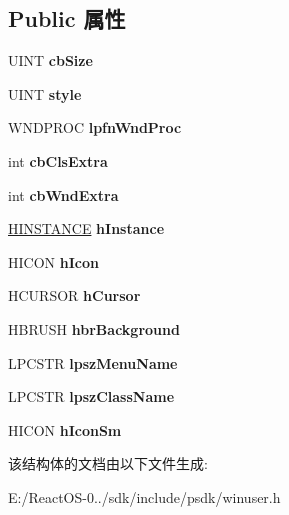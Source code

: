 \subsection*{Public 属性}
\begin{DoxyCompactItemize}
\item 
\mbox{\label{struct___w_n_d_c_l_a_s_s_e_x_a_aa01d015d223ea74c619ea89ccd707ed6}} 
U\+I\+NT {\bfseries cb\+Size}
\item 
\mbox{\label{struct___w_n_d_c_l_a_s_s_e_x_a_a96fccbeabe8f9ae63be08db3af3f5079}} 
U\+I\+NT {\bfseries style}
\item 
\mbox{\label{struct___w_n_d_c_l_a_s_s_e_x_a_ab196a241b43101d6a1db0991bd351076}} 
W\+N\+D\+P\+R\+OC {\bfseries lpfn\+Wnd\+Proc}
\item 
\mbox{\label{struct___w_n_d_c_l_a_s_s_e_x_a_a026c767f2e43eea8e79c28a7d19100c0}} 
int {\bfseries cb\+Cls\+Extra}
\item 
\mbox{\label{struct___w_n_d_c_l_a_s_s_e_x_a_a9791e6608f777098fd771e156796879b}} 
int {\bfseries cb\+Wnd\+Extra}
\item 
\mbox{\label{struct___w_n_d_c_l_a_s_s_e_x_a_a5dbc3d04505ab35312dc4e0252425670}} 
\hyperlink{interfacevoid}{H\+I\+N\+S\+T\+A\+N\+CE} {\bfseries h\+Instance}
\item 
\mbox{\label{struct___w_n_d_c_l_a_s_s_e_x_a_acf3768a94ac5860f90f436723ad25035}} 
H\+I\+C\+ON {\bfseries h\+Icon}
\item 
\mbox{\label{struct___w_n_d_c_l_a_s_s_e_x_a_a6c1f7c8fd3bc3ab28aa5f21c3243b089}} 
H\+C\+U\+R\+S\+OR {\bfseries h\+Cursor}
\item 
\mbox{\label{struct___w_n_d_c_l_a_s_s_e_x_a_aea24943cfd9369b7440a066978823744}} 
H\+B\+R\+U\+SH {\bfseries hbr\+Background}
\item 
\mbox{\label{struct___w_n_d_c_l_a_s_s_e_x_a_a76da00af1d6d5aa7bc9e0aa83baf10d8}} 
L\+P\+C\+S\+TR {\bfseries lpsz\+Menu\+Name}
\item 
\mbox{\label{struct___w_n_d_c_l_a_s_s_e_x_a_ac575a3befc9e27fc1fd567d899c6ecc4}} 
L\+P\+C\+S\+TR {\bfseries lpsz\+Class\+Name}
\item 
\mbox{\label{struct___w_n_d_c_l_a_s_s_e_x_a_a81f7e1b106bdf0a4cdc894101e542e03}} 
H\+I\+C\+ON {\bfseries h\+Icon\+Sm}
\end{DoxyCompactItemize}


该结构体的文档由以下文件生成\+:\begin{DoxyCompactItemize}
\item 
E\+:/\+React\+O\+S-\/0../sdk/include/psdk/winuser.\+h\end{DoxyCompactItemize}

